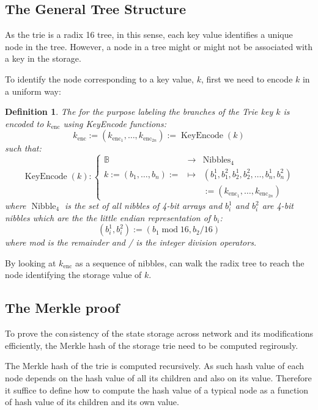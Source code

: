 \documentclass{article}
\newcommand{\assign}{:=}
\newcommand{\nosymbol}{}
\newcommand{\tmop}[1]{\ensuremath{\operatorname{#1}}}
\newtheorem{definition}{Definition}
\begin{document}
\subsection{The General Tree Structure}

As the trie is a radix 16 tree, in this sense, each key value identifies a
unique node in the tree. However, a node in a tree might or might not be
associated with a key in the storage.

To identify the node corresponding to a key value, $k$, first we need to
encode $k$ in a uniform way:

\begin{definition}
  The for the purpose labeling the branches of the Trie key $k$ is encoded to
  $k_{\tmop{enc}}$ using KeyEncode functions:
  \begin{equation}
    k_{\tmop{enc}} \assign (k_{\tmop{enc}_1}, \ldots, k_{\tmop{enc}_{2 n}})
    \assign \tmop{KeyEncode} (k) \label{key-encode-in-trie}
  \end{equation}
  such that:
  \[ \tmop{KeyEncode} (k) : \left\{ \begin{array}{lll}
       \mathbb{B}^{\nosymbol} & \rightarrow & \tmop{Nibbles}_4\\
       k \assign (b_1, \ldots, b_n) \assign & \mapsto & (b^1_1, b^2_1, b_2^1,
       b^2_2, \ldots, b^1_n, b^2_n)\\
       &  & \assign (k_{\tmop{enc}_1}, \ldots, k_{\tmop{enc}_{2 n}})
     \end{array} \right. \]
  where $\tmop{Nibble}_4$ is the set of all nibbles of 4-bit arrays and
  $b^1_i$ and $b^2_i$ are 4-bit nibbles which are the the little endian
  representation of $b_i$:
  \[ (b^1_i, b^2_i) \assign (b_1 \tmop{mod} 16, b_2 / 16) \]
  where mod is the remainder and / is the integer division operators.
\end{definition}

By looking at $k_{\tmop{enc}}$ as a sequence of nibbles, can walk the radix
tree to reach the node identifying the storage value of $k$.

\subsection{The Merkle proof}

To prove the con\,sistency of the state storage across network and its
modifications efficiently, the Merkle hash of the storage trie need to be
computed regirously.

The Merkle hash of the trie is computed recursively. As such hash value of
each node depends on the hash value of all its children and also on its value.
Therefore it suffice to define how to compute the hash value of a typical node
as a function of hash value of its children and its own value.
\end{document}
